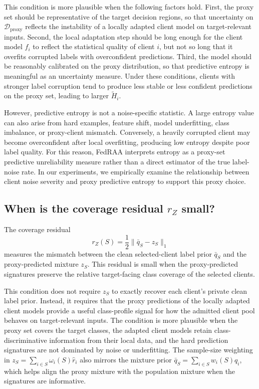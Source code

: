 \documentclass[conference]{IEEEtran}
\theoremstyle{definition}
\theoremstyle{remark}
\begin{document}
This condition is more plausible when the following factors hold.
First, the proxy set should be representative of the target decision regions, so that uncertainty on $\mathcal D_{\mathrm{proxy}}$ reflects the instability of a locally adapted client model on target-relevant inputs.
Second, the local adaptation step should be long enough for the client model $f_i$ to reflect the statistical quality of client $i$, but not so long that it overfits corrupted labels with overconfident predictions.
Third, the model should be reasonably calibrated on the proxy distribution, so that predictive entropy is meaningful as an uncertainty measure.
Under these conditions, clients with stronger label corruption tend to produce less stable or less confident predictions on the proxy set, leading to larger $\widetilde H_i$.

However, predictive entropy is not a noise-specific statistic.
A large entropy value can also arise from hard examples, feature shift, model underfitting, class imbalance, or proxy-client mismatch.
Conversely, a heavily corrupted client may become overconfident after local overfitting, producing low entropy despite poor label quality.
For this reason, FedRAA interprets entropy as a proxy-set predictive unreliability measure rather than a direct estimator of the true label-noise rate.
In our experiments, we empirically examine the relationship between client noise severity and proxy predictive entropy to support this proxy choice.

\subsection{When is the coverage residual $r_Z$ small?}
\label{app:coverage_residual}

The coverage residual
\[
r_Z(S)
=
\frac12\|\bar q_S-z_S\|_1
\]
measures the mismatch between the clean selected-client label prior $\bar q_S$ and the proxy-predicted mixture $z_S$.
This residual is small when the proxy-predicted signatures preserve the relative target-facing class coverage of the selected clients.

This condition does not require $z_S$ to exactly recover each client's private clean label prior.
Instead, it requires that the proxy predictions of the locally adapted client models provide a useful class-profile signal for how the admitted client pool behaves on target-relevant inputs.
The condition is more plausible when the proxy set covers the target classes, the adapted client models retain class-discriminative information from their local data, and the hard prediction signatures are not dominated by noise or underfitting.
The sample-size weighting in $z_S=\sum_{i\in S}\omega_i(S)\hat r_i$ also mirrors the mixture prior $\bar q_S=\sum_{i\in S}w_i(S)q_i$, which helps align the proxy mixture with the population mixture when the signatures are informative.
\end{document}
